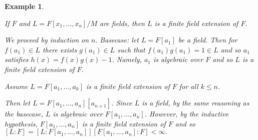 \documentclass[12pt]{Qual}
\newtheorem{example}{Example}
\begin{document}
\vspace{0.5cm}
\begin{example}
$\,$

\begin{framed}
If $F$ and $L=F[x_1,...,x_n]/M$ are fields, then $L$ is a finite field extension of $F$.
\end{framed}

We proceed by induction on $n.$ Basecase: let $L=F[a_1]$ be a field. Then for $f(a_1)\in L$ there exists $g(a_1)\in L$ such that $f(a_1)g(a_1)=1\in L$ and so $a_1$ satisfies $h(x)=f(x)g(x)-1$. Namely, $a_1$ is algebraic over $F$ and so $L$ is a finite field extension of $F.$
\vspace{0.25cm}

Assume $L=F[a_1,...,a_k]$ is a finite field extension of $F$ for all $k\le n$.
\vspace{0.25cm}

Then let $L=F[a_1,...,a_n][a_{n+1}]$. Since $L$ is a field, by the same reasoning as the basecase, $L$ is algebraic over $F[a_1,...,a_n]$. However, by the inductive hypothesis, $F[a_1,...,a_n]$ is a finite field extension of $F$ and so $[L:F]=[L:F[a_1,...,a_n]][F[a_1,...,a_n]:F]<\infty.$
\end{example}
\end{document}
